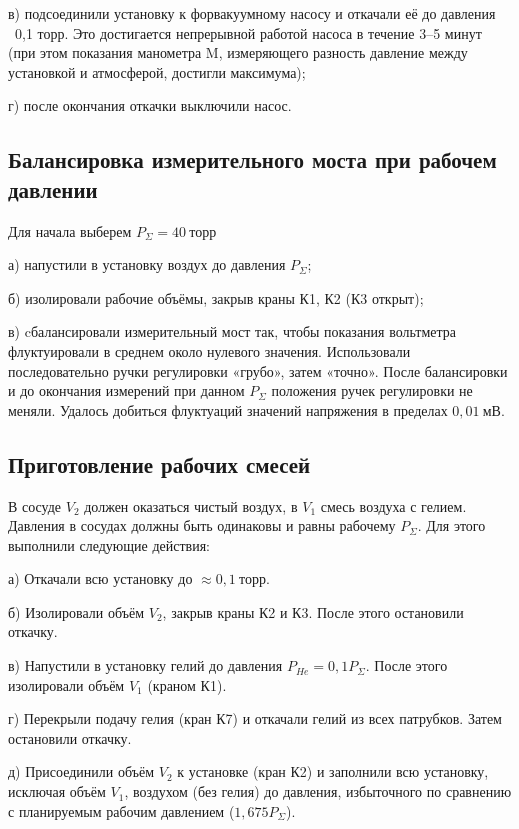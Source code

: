 \documentclass[a4paper, 12pt]{article}
\begin{document}
        в) подсоединили установку к форвакуумному насосу и откачали её до давления
        ~0,1 торр. Это достигается непрерывной работой насоса в течение
        3–5 минут (при этом показания манометра M, измеряющего разность
        давление между установкой и атмосферой, достигли максимума);

        г) после окончания откачки выключили насос.

    \subsection{Балансировка измерительного моста при рабочем давлении}

        Для начала выберем $P_{\Sigma} = 40~торр$

        а) напустили в установку воздух до давления $P_{\Sigma}$;

        б) изолировали рабочие объёмы, закрыв краны К1, К2 (К3 открыт);

        в) cбалансировали измерительный мост так, чтобы показания вольтметра флуктуировали в среднем около нулевого значения. Использовали последовательно ручки регулировки «грубо», затем «точно». После балансировки и до окончания измерений при данном $P_{\Sigma}$ положения ручек регулировки не меняли. Удалось добиться флуктуаций значений напряжения в пределах $0,01~мВ$.

    \subsection{Приготовление рабочих смесей}

        В сосуде $V_2$ должен оказаться чистый воздух, в $V_1$ смесь воздуха с гелием. Давления в сосудах должны быть одинаковы и равны рабочему $P_{\Sigma}$. Для этого выполнили следующие действия:

        а) Откачали всю установку до $\approx 0,1~торр$.

        б) Изолировали объём $V_2$, закрыв краны К2 и К3. После этого остановили откачку.

        в) Напустили в установку гелий до давления $P_{He} = 0,1P_{\Sigma}$. После этого изолировали объём $V_1$ (краном К1).

        г) Перекрыли подачу гелия (кран К7) и откачали гелий из всех патрубков. Затем остановили откачку.

        д) Присоединили объём $V_2$ к установке (кран К2) и заполнили всю установку, исключая объём $V_1$, воздухом (без гелия) до давления, избыточного по сравнению с планируемым рабочим давлением ($1,675P_{\Sigma}$).
\end{document}
